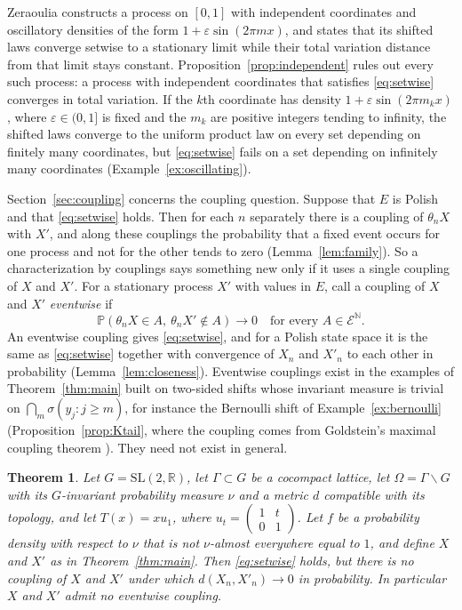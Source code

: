 \documentclass[11pt]{amsart}
\newtheorem{theorem}{Theorem}[section]
\theoremstyle{definition}
\theoremstyle{remark}
\newcommand{\N}{\mathbb N}
\newcommand{\R}{\mathbb R}
\newcommand{\Prob}{\mathbb P}
\newcommand{\cE}{\mathcal E}
\begin{document}
Zeraoulia \cite{Zer26} constructs a process on $[0,1]$ with independent coordinates and oscillatory densities of
the form $1+\varepsilon\sin(2\pi mx)$, and states that its shifted laws converge setwise to a stationary limit
while their total variation distance from that limit stays constant.
Proposition~\ref{prop:independent} rules out every such process: a process with independent coordinates that
satisfies \eqref{eq:setwise} converges in total variation. If the $k$th coordinate has density
$1+\varepsilon\sin(2\pi m_kx)$, where $\varepsilon\in(0,1]$ is fixed and the $m_k$ are positive integers tending to
infinity, the shifted laws converge to the uniform product law on every set depending on finitely many coordinates,
but \eqref{eq:setwise} fails on a set depending on infinitely many coordinates (Example~\ref{ex:oscillating}).

Section~\ref{sec:coupling} concerns the coupling question. Suppose that $E$ is Polish and that
\eqref{eq:setwise} holds. Then for each $n$
separately there is a coupling of $\theta_nX$ with $X'$, and along these couplings the probability that a fixed event
occurs for one process and not for the other tends to zero (Lemma~\ref{lem:family}). So a characterization by
couplings says something new only if it uses a single coupling of $X$ and $X'$. For a stationary process $X'$ with
values in $E$, call a coupling of $X$ and $X'$ \emph{eventwise} if
\begin{equation}\label{eq:eventwise}
\Prob(\theta_nX\in A,\ \theta_nX'\notin A)\to0\quad\text{for every }A\in\cE^{\N}.
\end{equation}
An eventwise coupling gives \eqref{eq:setwise}, and for a Polish state space it is the same as \eqref{eq:setwise}
together with convergence of $X_n$ and $X'_n$ to each other in probability (Lemma~\ref{lem:closeness}). Eventwise
couplings exist in the examples of Theorem~\ref{thm:main} built on two-sided shifts whose invariant measure is trivial on $\bigcap_m\sigma(y_j:j\ge m)$, for instance the
Bernoulli shift of Example~\ref{ex:bernoulli} (Proposition~\ref{prop:Ktail}, where the coupling comes from Goldstein's maximal coupling
theorem \cite{Gol79}). They need not exist in general.

\begin{theorem}\label{thm:horocycle}
Let $G=\mathrm{SL}(2,\R)$, let $\Gamma\subset G$ be a cocompact lattice, let $\Omega=\Gamma\backslash G$ with its
$G$-invariant probability measure $\nu$ and a metric $d$ compatible with its topology, and let $T(x)=xu_1$, where
$u_t=\left(\begin{smallmatrix}1&t\\0&1\end{smallmatrix}\right)$. Let $f$ be a probability density with respect to $\nu$
that is not $\nu$-almost everywhere equal to $1$, and define $X$ and $X'$ as in Theorem~\ref{thm:main}. Then
\eqref{eq:setwise} holds, but there is no coupling of $X$ and $X'$ under which $d(X_n,X'_n)\to0$ in probability. In
particular $X$ and $X'$ admit no eventwise coupling.
\end{theorem}
\end{document}
